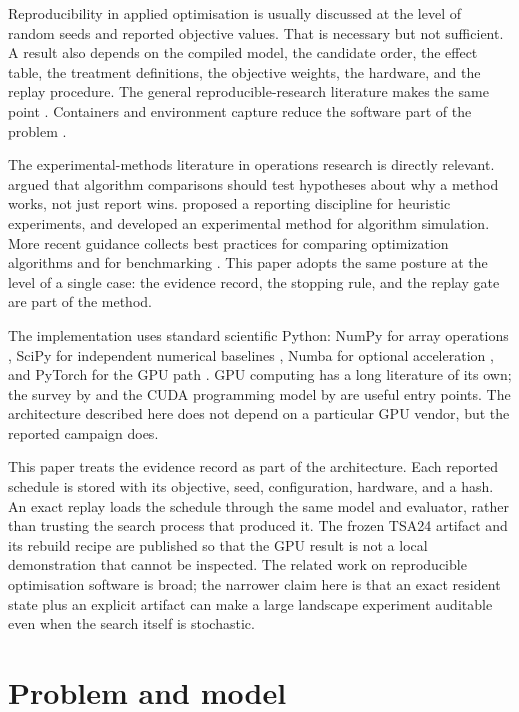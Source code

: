 \documentclass[preprint,11pt]{elsarticle}
\begin{document}
Reproducibility in applied optimisation is usually discussed at the level of random seeds and reported
objective values. That is necessary but not sufficient. A result also depends on the compiled model,
the candidate order, the effect table, the treatment definitions, the objective weights, the hardware,
and the replay procedure. The general reproducible-research literature makes the same point
\citep{peng2011,sandve2013,wilson2014,stodden2016}. Containers and environment capture reduce the
software part of the problem \citep{boettiger2015,kurtzer2017}.

The experimental-methods literature in operations research is directly relevant. \citet{hooker1995}
argued that algorithm comparisons should test hypotheses about why a method works, not just report
wins. \citet{barr1995} proposed a reporting discipline for heuristic experiments, and
\citet{mcgeoch1996} developed an experimental method for algorithm simulation. More recent guidance
collects best practices for comparing optimization algorithms and for benchmarking
\citep{beiranvand2017,bartz2020}. This paper adopts the same posture at the level of a single case:
the evidence record, the stopping rule, and the replay gate are part of the method.

The implementation uses standard scientific Python: NumPy for array operations
\citep{harris2020}, SciPy for independent numerical baselines \citep{virtanen2020}, Numba for
optional acceleration \citep{lam2015}, and PyTorch for the GPU path \citep{paszke2019}. GPU
computing has a long literature of its own; the survey by \citet{owens2008} and the CUDA programming
model by \citet{nickolls2008} are useful entry points. The architecture described here does not
depend on a particular GPU vendor, but the reported campaign does.

This paper treats the evidence record as part of the architecture. Each reported schedule is stored
with its objective, seed, configuration, hardware, and a hash. An exact replay loads the schedule
through the same model and evaluator, rather than trusting the search process that produced it. The
frozen TSA24 artifact and its rebuild recipe are published so that the GPU result is not a local
demonstration that cannot be inspected. The related work on reproducible optimisation software is
broad; the narrower claim here is that an exact resident state plus an explicit artifact can make a
large landscape experiment auditable even when the search itself is stochastic.

\section{Problem and model}\label{problem-and-model}
\end{document}
